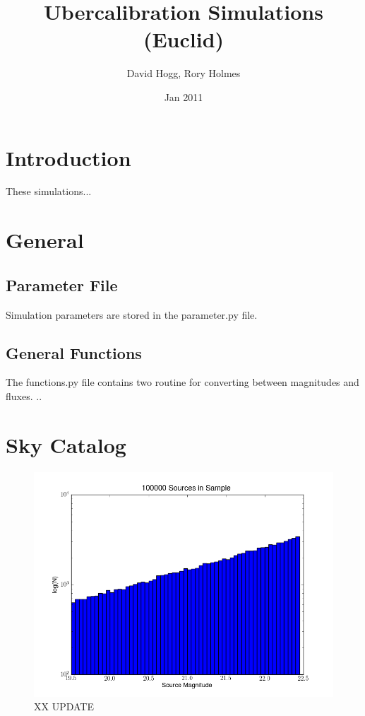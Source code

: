 \documentclass[12pt,a4paper,twoside]{article}
\author{David Hogg, Rory Holmes}
\title{Ubercalibration Simulations \\(Euclid)}
\date{Jan 2011}
\makeatletter
\def\maketitle{%
  \null
  \thispagestyle{empty}%
  \vfill
  \begin{center}\leavevmode
    \normalfont
    {\LARGE \@title\par}%
    \vskip 1cm
    {\Large \@author\par}%
    \vskip 1cm
    {\Large \@date\par}%
  \end{center}%
  \vfill
  \null
  \cleardoublepage
  }
\makeatother
\begin{document}
\maketitle

\section{Introduction}
These simulations... 

\section{General}

\subsection{Parameter File}

Simulation parameters are stored in the parameter.py file.

\subsection{General Functions}
The functions.py file contains two routine for converting between magnitudes and fluxes. ..

\section{Sky Catalog}

\begin{figure}[ht]
\begin{center}
\includegraphics[width=\textwidth]{source_mag_histogram.png}
\end{center}
\caption{XX UPDATE \label{fig:source_magnitude}}
\end{figure}
\end{document}
